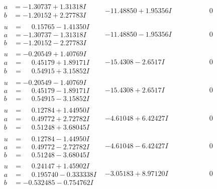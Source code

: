 \documentclass[1p]{elsarticle_modified}
\theoremstyle{definition}
\begin{document}
$$\begin{array}{c|c|c}
\begin{aligned}
a &= -1.30737 + 1.31318 I \\
b &= -1.20152 + 2.27783 I\end{aligned}
 & -11.48850 + 1.95356 I & \phantom{-0.000000 } 0 \\ \hline\begin{aligned}
u &= \phantom{-}0.15765 - 1.41350 I \\
a &= -1.30737 - 1.31318 I \\
b &= -1.20152 - 2.27783 I\end{aligned}
 & -11.48850 - 1.95356 I & \phantom{-0.000000 } 0 \\ \hline\begin{aligned}
u &= -0.20549 + 1.40769 I \\
a &= \phantom{-}0.45179 + 1.89171 I \\
b &= \phantom{-}0.54915 + 3.15852 I\end{aligned}
 & -15.4308 - 2.6517 I & \phantom{-0.000000 } 0 \\ \hline\begin{aligned}
u &= -0.20549 - 1.40769 I \\
a &= \phantom{-}0.45179 - 1.89171 I \\
b &= \phantom{-}0.54915 - 3.15852 I\end{aligned}
 & -15.4308 + 2.6517 I & \phantom{-0.000000 } 0 \\ \hline\begin{aligned}
u &= \phantom{-}0.12784 + 1.44950 I \\
a &= \phantom{-}0.49772 + 2.72782 I \\
b &= \phantom{-}0.51248 + 3.68045 I\end{aligned}
 & -4.61048 + 6.42427 I & \phantom{-0.000000 } 0 \\ \hline\begin{aligned}
u &= \phantom{-}0.12784 - 1.44950 I \\
a &= \phantom{-}0.49772 - 2.72782 I \\
b &= \phantom{-}0.51248 - 3.68045 I\end{aligned}
 & -4.61048 - 6.42427 I & \phantom{-0.000000 } 0 \\ \hline\begin{aligned}
u &= \phantom{-}0.24147 + 1.45902 I \\
a &= \phantom{-}0.195740 - 0.333338 I \\
b &= -0.532485 - 0.754762 I\end{aligned}
 & -3.05183 + 8.97120 I & \phantom{-0.000000 } 0 \\ \hline\begin{aligned}

\end{aligned}
\end{array}$$
\end{document}
